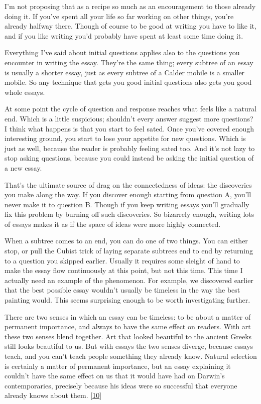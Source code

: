 I'm not proposing that as a recipe so much as an encouragement to those
already doing it. If you've spent all your life so far working on other
things, you're already halfway there. Though of course to be good at
writing you have to like it, and if you like writing you'd probably have
spent at least some time doing it.

Everything I've said about initial questions applies also to the
questions you encounter in writing the essay. They're the same thing;
every subtree of an essay is usually a shorter essay, just as every
subtree of a Calder mobile is a smaller mobile. So any technique that
gets you good initial questions also gets you good whole essays.

At some point the cycle of question and response reaches what feels like
a natural end. Which is a little suspicious; shouldn't every answer
suggest more questions? I think what happens is that you start to feel
sated. Once you've covered enough interesting ground, you start to lose
your appetite for new questions. Which is just as well, because the
reader is probably feeling sated too. And it's not lazy to stop asking
questions, because you could instead be asking the initial question of a
new essay.

That's the ultimate source of drag on the connectedness of ideas: the
discoveries you make along the way. If you discover enough starting from
question A, you'll never make it to question B. Though if you keep
writing essays you'll gradually fix this problem by burning off such
discoveries. So bizarrely enough, writing lots of essays makes it as if
the space of ideas were more highly connected.

When a subtree comes to an end, you can do one of two things. You can
either stop, or pull the Cubist trick of laying separate subtrees end to
end by returning to a question you skipped earlier. Usually it requires
some sleight of hand to make the essay flow continuously at this point,
but not this time. This time I actually need an example of the
phenomenon. For example, we discovered earlier that the best possible
essay wouldn't usually be timeless in the way the best painting would.
This seems surprising enough to be worth investigating further.

There are two senses in which an essay can be timeless: to be about a
matter of permanent importance, and always to have the same effect on
readers. With art these two senses blend together. Art that looked
beautiful to the ancient Greeks still looks beautiful to us. But with
essays the two senses diverge, because essays teach, and you can't teach
people something they already know. Natural selection is certainly a
matter of permanent importance, but an essay explaining it couldn't have
the same effect on us that it would have had on Darwin's contemporaries,
precisely because his ideas were so successful that everyone already
knows about them. {[}\hyperref[f10n]{10}{]}

